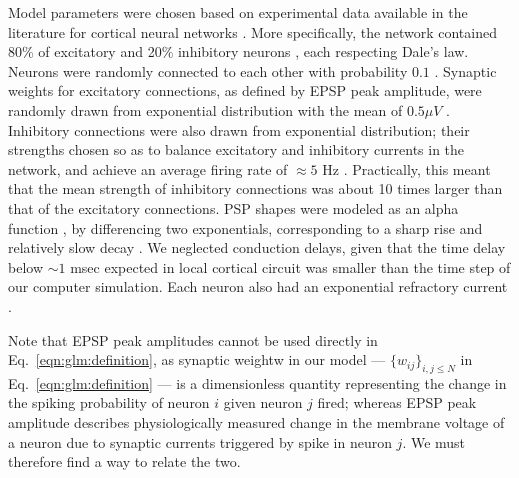 Model parameters were chosen based on experimental data available in the literature for cortical neural networks \cite{Braitenberg1998,Urquijo2000,Lefort2009,Sayer1990}. More specifically, the network contained 80\% of excitatory and 20\% inhibitory neurons \cite{Braitenberg1998,Urquijo2000}, each respecting Dale's law. Neurons were randomly connected to each other with probability $0.1$ \cite{Braitenberg1998,Lefort2009}. Synaptic weights for excitatory connections, as defined by EPSP peak amplitude, were randomly drawn from exponential distribution with the mean of $0.5 \mu V$ \cite{Lefort2009,Sayer1990}. Inhibitory connections were also drawn from exponential distribution; their strengths chosen so as to balance excitatory and inhibitory currents in the network, and achieve an average firing rate of $\approx 5 $ Hz \cite{Abeles91}. Practically, this meant that the mean strength of inhibitory connections was about 10 times larger than that of the excitatory connections. PSP shapes were modeled as an alpha function \cite{Koch99}, by differencing two exponentials, corresponding to a sharp rise and relatively slow decay \cite{Sayer1990}. We neglected conduction delays, given that the time delay below $\sim 1$ msec expected in local cortical circuit was smaller than the time step of our computer simulation. Each neuron also had an exponential refractory current \cite{Koch99}.

Note that EPSP peak amplitudes cannot be used directly in Eq.~\eqref{eqn:glm:definition}, as synaptic weightw in our model --- $\{w_{ij}\}_{i,j \leq N}$ in Eq.~\eqref{eqn:glm:definition} --- is a dimensionless quantity representing the change in the spiking probability of neuron $i$ given neuron $j$ fired; whereas EPSP peak amplitude describes physiologically measured change in the membrane voltage of a neuron due to synaptic currents triggered by spike in neuron $j$. We must therefore find a way to relate the two.

